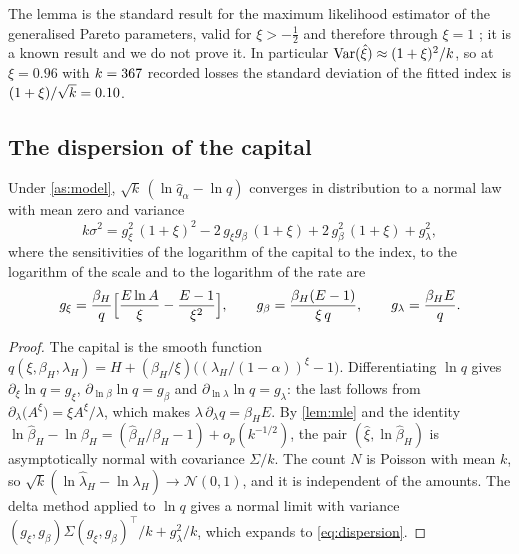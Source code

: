 The lemma is the standard result for the maximum likelihood estimator of the generalised Pareto parameters, valid for $\xi>-\tfrac12$ and therefore through $\xi=1$ \citep{smith1987,drees2004}; it is a known result and we do not prove it. In particular $\operatorname{Var}(\hat\xi)\approx(1+\xi)^2/k$, so at $\xi=0.96$ with $k=367{}$ recorded losses the standard deviation of the fitted index is $(1+\xi)/\sqrt k=0.10{}$.

\subsection{The dispersion of the capital}
\label{sec:theory-dispersion}

\begin{proposition}
\label{prop:dispersion}
Under \cref{as:model}, $\sqrt k\,(\ln\hat q_\alpha-\ln q)$ converges in distribution to a normal law with mean zero and variance
\begin{equation}
k\sigma^2=g_\xi^{2}\,(1+\xi)^2-2\,g_\xi g_\beta\,(1+\xi)+2\,g_\beta^{2}\,(1+\xi)+g_\lambda^{2},
\label{eq:dispersion}
\end{equation}
where the sensitivities of the logarithm of the capital to the index, to the logarithm of the scale and to the logarithm of the rate are
\begin{equation}
g_\xi=\frac{\beta_H}{q}\Bigl[\frac{E\ln A}{\xi}-\frac{E-1}{\xi^2}\Bigr],\qquad g_\beta=\frac{\beta_H(E-1)}{\xi\,q},\qquad g_\lambda=\frac{\beta_H E}{q}.
\label{eq:sensitivities}
\end{equation}
\end{proposition}

\begin{proof}
The capital is the smooth function $q(\xi,\beta_H,\lambda_H)=H+(\beta_H/\xi)\bigl((\lambda_H/(1-\alpha))^{\xi}-1\bigr)$. Differentiating $\ln q$ gives $\partial_\xi\ln q=g_\xi$, $\partial_{\ln\beta}\ln q=g_\beta$ and $\partial_{\ln\lambda}\ln q=g_\lambda$: the last follows from $\partial_\lambda\bigl(A^{\xi}\bigr)=\xi A^{\xi}/\lambda$, which makes $\lambda\,\partial_\lambda q=\beta_H E$. By \cref{lem:mle} and the identity $\ln\hat\beta_H-\ln\beta_H=(\hat\beta_H/\beta_H-1)+o_p(k^{-1/2})$, the pair $(\hat\xi,\ln\hat\beta_H)$ is asymptotically normal with covariance $\Sigma/k$. The count $N$ is Poisson with mean $k$, so $\sqrt k(\ln\hat\lambda_H-\ln\lambda_H)\to\mathcal N(0,1)$, and it is independent of the amounts. The delta method applied to $\ln q$ gives a normal limit with variance $(g_\xi,g_\beta)\Sigma(g_\xi,g_\beta)^{\top}/k+g_\lambda^2/k$, which expands to \cref{eq:dispersion}.
\end{proof}

